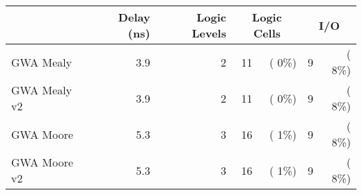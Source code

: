 % 
% 
\begin{tabular}{l|rr|rr|rr}
     & Delay (ns) & Logic Levels & \multicolumn{2}{c|}{Logic Cells} & \multicolumn{2}{c}{I/O} \\
\hline
GWA Mealy   &    3.9 &      2  &    11 & (  0\%)  &     9 & (  8\%)\\ 
GWA Mealy v2   &    3.9 &      2  &    11 & (  0\%)  &     9 & (  8\%)\\ 
GWA Moore   &    5.3 &      3  &    16 & (  1\%)  &     9 & (  8\%)\\ 
GWA Moore v2   &    5.3 &      3  &    16 & (  1\%)  &     9 & (  8\%)\\ 
\end{tabular}
